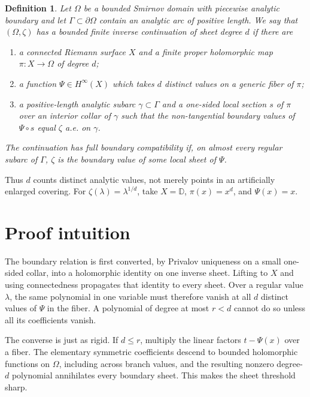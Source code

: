 \documentclass[11pt]{article}
\newtheorem{definition}[theorem]{Definition}
\newcommand{\D}{\mathbb D}
\begin{document}
\begin{definition}\label{def:cover}
Let $\Omega$ be a bounded Smirnov domain with piecewise analytic boundary and
let $\Gamma\subset\partial\Omega$ contain an analytic arc of positive length.
We say that $(\Omega,\zeta)$ has a \emph{bounded finite inverse continuation
of sheet degree $d$} if there are
\begin{enumerate}[label=(\roman*)]
\item a connected Riemann surface $X$ and a finite proper holomorphic map
      $\pi:X\to\Omega$ of degree $d$;
\item a function $\Psi\in H^\infty(X)$ which takes $d$ distinct values on a
      generic fiber of $\pi$;
\item a positive-length analytic subarc $\gamma\subset\Gamma$ and a
      one-sided local section $s$ of $\pi$ over an interior collar of
      $\gamma$ such that the non-tangential boundary values of
      $\Psi\circ s$ equal $\zeta$ a.e. on $\gamma$.
\end{enumerate}
The continuation has \emph{full boundary compatibility} if, on almost every
regular subarc of $\Gamma$, $\zeta$ is the boundary value of some local sheet
of $\Psi$.
\end{definition}

Thus $d$ counts distinct analytic values, not merely points in an artificially
enlarged covering.  For $\zeta(\lambda)=\lambda^{1/d}$, take
$X=\D$, $\pi(x)=x^d$, and $\Psi(x)=x$.

\section{Proof intuition}

The boundary relation is first converted, by Privalov uniqueness on a small
one-sided collar, into a holomorphic identity on one inverse sheet.  Lifting
to $X$ and using connectedness propagates that identity to every sheet.  Over
a regular value $\lambda$, the same polynomial in one variable must therefore
vanish at all $d$ distinct values of $\Psi$ in the fiber.  A polynomial of
degree at most $r<d$ cannot do so unless all its coefficients vanish.

The converse is just as rigid.  If $d\le r$, multiply the linear factors
$t-\Psi(x)$ over a fiber.  The elementary symmetric coefficients descend to
bounded holomorphic functions on $\Omega$, including across branch values,
and the resulting nonzero degree-$d$ polynomial annihilates every boundary
sheet.  This makes the sheet threshold sharp.
\end{document}
